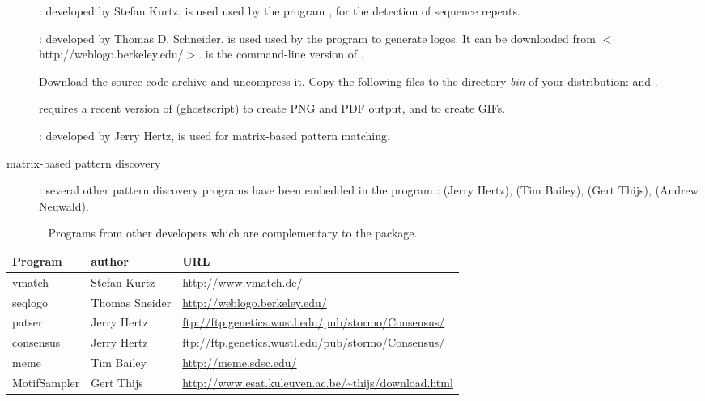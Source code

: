 \documentclass[12pt,a4paper, oneside]{scrreprt} %
\begin{document}
\begin{description}
\item[]: developed by Stefan Kurtz, is used used by the
program , for the detection of sequence repeats.

\item[]:  developed by Thomas D. Schneider, is used
used by the program  to generate logos. It can
be downloaded from $<$http://weblogo.berkeley.edu/$>$.  is
the command-line version of .

Download the source code archive and uncompress it. Copy the following
 files to the directory \emph{bin} of your \RSAT distribution:
 and .

 requires a recent version of 
(ghostscript) to create PNG and
PDF output, and  to create GIFs.

\item[]: developed by Jerry Hertz, is used for
  matrix-based pattern matching.

\item[matrix-based pattern discovery]: several other pattern discovery
  programs have been embedded in the \RSAT program
  :
 (Jerry Hertz),
 (Tim Bailey),
 (Gert Thijs),
 (Andrew Neuwald).


\end{description}


\begin{table}
\begin{center}
\begin{tabular}{lll}
  \hline
  Program & author  & URL \\
  \hline
  vmatch & Stefan Kurtz & \footnotesize{\url{http://www.vmatch.de/}} \\
  seqlogo & Thomas Sneider & \footnotesize{\url{http://weblogo.berkeley.edu/}} \\
  patser & Jerry Hertz & \footnotesize{\url{ftp://ftp.genetics.wustl.edu/pub/stormo/Consensus/}} \\
  consensus & Jerry Hertz &  \footnotesize{\url{ftp://ftp.genetics.wustl.edu/pub/stormo/Consensus/}} \\
  meme & Tim Bailey & \footnotesize{\url{http://meme.sdsc.edu/}} \\
  MotifSampler & Gert Thijs & \footnotesize{\url{http://www.esat.kuleuven.ac.be/~thijs/download.html}} \\
  \hline
\end{tabular}
\end{center}
\caption{\label{table:other_programs} Programs from other developers
  which are complementary to the \RSAT package.}
\end{table}
\end{document}
